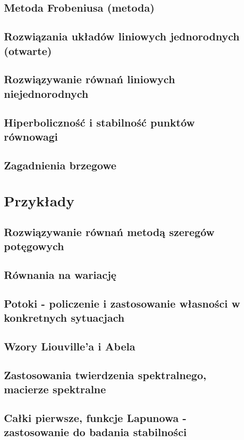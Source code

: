     \section{Metoda Frobeniusa (metoda)}
      
    \section{Rozwiązania układów liniowych jednorodnych (otwarte)}
      
    \section{Rozwiązywanie równań liniowych niejednorodnych}
      
    \section{Hiperboliczność i stabilność punktów równowagi}
      
    \section{Zagadnienia brzegowe}
      
  
  \chapter{Przykłady}
    \section{Rozwiązywanie równań metodą szeregów potęgowych}
    \section{Równania na wariację}
    \section{Potoki - policzenie i zastosowanie własności w konkretnych sytuacjach}
    \section{Wzory Liouville'a i Abela}
    \section{Zastosowania twierdzenia spektralnego, macierze spektralne}
    \section{Całki pierwsze, funkcje Lapunowa - zastosowanie do badania stabilności}

































